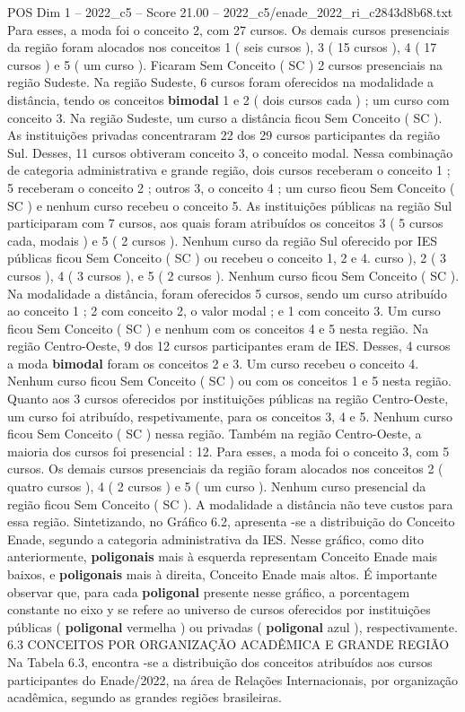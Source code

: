 \begin{textsample}{POS Dim 1 – 2022\_c5 – Score 21.00 – 2022\_c5/enade\_2022\_ri\_c2843d8b68.txt}
Para esses, a moda foi o conceito 2, com 27 cursos.
Os demais cursos presenciais da região foram alocados nos conceitos 1 ( seis cursos ), 3 ( 15 cursos ), 4 ( 17 cursos ) e 5 ( um curso ).
Ficaram Sem Conceito ( SC ) 2 cursos presenciais na região Sudeste.
Na região Sudeste, 6 cursos foram oferecidos na modalidade a distância, tendo os conceitos \textbf{bimodal} 1 e 2 ( dois cursos cada ) ; um curso com conceito 3.
Na região Sudeste, um curso a distância ficou Sem Conceito ( SC ).
As instituições privadas concentraram 22 dos 29 cursos participantes da região Sul.
Desses, 11 cursos obtiveram conceito 3, o conceito modal.
Nessa combinação de categoria administrativa e grande região, dois cursos receberam o conceito 1 ; 5 receberam o conceito 2 ; outros 3, o conceito 4 ; um curso ficou Sem Conceito ( SC ) e nenhum curso recebeu o conceito 5.
As instituições públicas na região Sul participaram com 7 cursos, aos quais foram atribuídos os conceitos 3 ( 5 cursos cada, modais ) e 5 ( 2 cursos ).
Nenhum curso da região Sul oferecido por IES públicas ficou Sem Conceito ( SC ) ou recebeu o conceito 1, 2 e 4. curso ), 2 ( 3 cursos ), 4 ( 3 cursos ), e 5 ( 2 cursos ).
Nenhum curso ficou Sem Conceito ( SC ).
Na modalidade a distância, foram oferecidos 5 cursos, sendo um curso atribuído ao conceito 1 ; 2 com conceito 2, o valor modal ; e 1 com conceito 3.
Um curso ficou Sem Conceito ( SC ) e nenhum com os conceitos 4 e 5 nesta região.
Na região Centro-Oeste, 9 dos 12 cursos participantes eram de IES.
Desses, 4 cursos a moda \textbf{bimodal} foram os conceitos 2 e 3.
Um curso recebeu o conceito 4.
Nenhum curso ficou Sem Conceito ( SC ) ou com os conceitos 1 e 5 nesta região.
Quanto aos 3 cursos oferecidos por instituições públicas na região Centro-Oeste, um curso foi atribuído, respetivamente, para os conceitos 3, 4 e 5.
Nenhum curso ficou Sem Conceito ( SC ) nessa região.
Também na região Centro-Oeste, a maioria dos cursos foi presencial : 12.
Para esses, a moda foi o conceito 3, com 5 cursos.
Os demais cursos presenciais da região foram alocados nos conceitos 2 ( quatro cursos ), 4 ( 2 cursos ) e 5 ( um curso ).
Nenhum curso presencial da região ficou Sem Conceito ( SC ).
A modalidade a distância não teve custos para essa região.
Sintetizando, no Gráfico 6.2, apresenta -se a distribuição do Conceito Enade, segundo a categoria administrativa da IES.
Nesse gráfico, como dito anteriormente, \textbf{poligonais} mais à esquerda representam Conceito Enade mais baixos, e \textbf{poligonais} mais à direita, Conceito Enade mais altos.
É importante observar que, para cada \textbf{poligonal} presente nesse gráfico, a porcentagem constante no eixo y se refere ao universo de cursos oferecidos por instituições públicas ( \textbf{poligonal} vermelha ) ou privadas ( \textbf{poligonal} azul ), respectivamente. 6.3 CONCEITOS POR ORGANIZAÇÃO ACADÊMICA E GRANDE REGIÃO Na Tabela 6.3, encontra -se a distribuição dos conceitos atribuídos aos cursos participantes do Enade/2022, na área de Relações Internacionais, por organização acadêmica, segundo as grandes regiões brasileiras.

\end{textsample}

